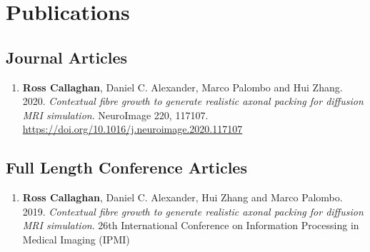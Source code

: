 


\setcounter{chapter}{1}
\chapter*{Publications}

\section*{Journal Articles}
\begin{enumerate}
\item \textbf{Ross Callaghan}, Daniel C. Alexander, Marco Palombo and Hui Zhang. 2020. \emph{Contextual fibre growth to generate realistic axonal packing for diffusion MRI simulation}. NeuroImage 220, 117107. \url{https://doi.org/10.1016/j.neuroimage.2020.117107}
\end{enumerate}


\section*{Full Length Conference Articles}
\begin{enumerate}

\item \textbf{Ross Callaghan}, Daniel C. Alexander, Hui Zhang and Marco Palombo. 2019. \emph{Contextual fibre growth to generate realistic axonal packing for diffusion MRI simulation}. 26th International Conference on Information Processing in Medical Imaging (IPMI)

\end{enumerate}

